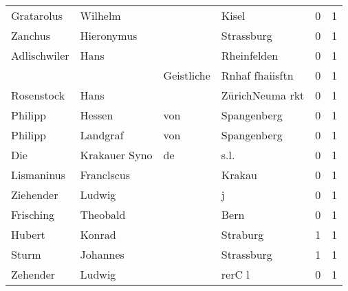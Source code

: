 \begin{center}
\begin{tiny}
\begin{longtabu}{llllrr}
               Gratarolus &                            Wilhelm &             &                                       Kisel &          0 &         1 \\
                  Zanchus &                         Hieronymus &             &                                  Strassburg &          0 &         1 \\
             Adlischwiler &                               Hans &             &                                 Rheinfelden &          0 &         1 \\
                          &                                    &  Geistliche &                             Rnhaf fhaiisftn &          0 &         1 \\
               Rosenstock &                               Hans &             &                             ZürichNeuma rkt &          0 &         1 \\
                  Philipp &                             Hessen &         von &                                 Spangenberg &          0 &         1 \\
                  Philipp &                           Landgraf &         von &                                 Spangenberg &          0 &         1 \\
                      Die &                      Krakauer Syno &          de &                                        s.l. &          0 &         1 \\
               Lismaninus &                         Franclscus &             &                                      Krakau &          0 &         1 \\
                Ziehender &                             Ludwig &             &                                           j &          0 &         1 \\
                Frisching &                           Theobald &             &                                        Bern &          0 &         1 \\
                   Hubert &                             Konrad &             &                                    Straburg &          1 &         1 \\
                    Sturm &                           Johannes &             &                                  Strassburg &          1 &         1 \\
                 Zehender &                             Ludwig &             &                                      rerC l &          0 &         1 \\

\end{longtabu}
\end{tiny}
\end{center}
